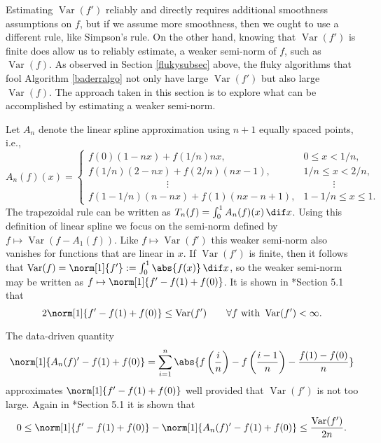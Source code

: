 \documentclass[]{article}
\DeclareMathOperator{\Var}{Var}
\theoremstyle{definition}
\theoremstyle{remark}
\begin{document}
Estimating $\Var(f')$ reliably and directly requires additional smoothness assumptions on $f$, but if we assume more smoothness, then we ought to use a different rule, like Simpson's rule.  On the other hand, knowing that $\Var(f')$ is finite does allow us to reliably estimate, a weaker semi-norm of $f$, such as $\Var(f)$.  As observed in Section \ref{flukysubsec} above, the fluky algorithms that fool Algorithm \ref{baderralgo} not only have large $\Var(f')$ but also large $\Var(f)$.  The approach taken in this section is to explore what can be accomplished by estimating a weaker semi-norm.

Let $A_n$ denote the linear spline approximation using $n+1$ equally spaced points, i.e., 
\begin{equation}
\label{Andef}
A_n(f)(x) = \begin{cases} f(0)(1-nx) + f(1/n)nx, & 0 \le x < 1/n, \\
f(1/n)(2-nx) + f(2/n)(nx-1), & 1/n \le x < 2/n, \\
\qquad \qquad \qquad \qquad \vdots & \qquad \quad \vdots \\
f(1-1/n)(n-nx) + f(1)(nx-n + 1), & 1-1/n \le x \le 1.
\end{cases}
\end{equation}   
The trapezoidal rule can be written as $T_n(f) = \int_0^1 A_n(f)(x) \, \dif x$.  Using this definition of linear spline we focus on the semi-norm defined by $f \mapsto \Var(f-A_1(f))$.  Like $f \mapsto \Var(f')$ this weaker semi-norm also vanishes for functions that are linear in $x$.  If $\Var(f')$ is finite, then it follows that $\Var(f) = \norm[1]{f'}:=\int_0^1 \abs{f(x)} \, \dif x$, so the weaker semi-norm may be written as $f \mapsto \norm[1]{f'-f(1)+f(0)}$.  It is shown in *{Section 5.1} that 
\begin{equation} \label{weaknorm}
2 \norm[1]{f'-f(1)+f(0)} \le \Var(f') \qquad \forall f \text{ with } \Var(f')<\infty.
\end{equation}

The data-driven quantity 
\begin{equation} \label{weaknormalgo}
\norm[1]{A_n(f)'-f(1)+f(0)}= \sum_{i=1}^n \abs{f\left(\frac in \right)-f\left(\frac{i-1}n \right) - \frac{f(1)-f(0)}{n}}
\end{equation}
approximates $\norm[1]{f'-f(1)+f(0)}$ well provided that $\Var(f')$ is not too large. Again in *{Section 5.1} it is shown that 
\begin{equation} \label{errweaknorm}
0 \le \norm[1]{f'-f(1)+f(0)} - \norm[1]{A_n(f)'-f(1)+f(0)} \le \frac{\Var(f')}{2n}.
\end{equation}
\end{document}
